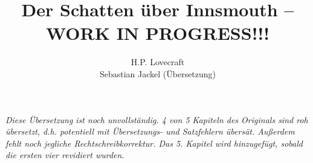 \documentclass[a4paper]{memoir}
\begin{document}
\title{Der Schatten über Innsmouth -- WORK IN PROGRESS!!!}
\author{H.P. Lovecraft\\
		Sebastian Jackel (Übersetzung)}
\date{}
\maketitle

\textit{Diese Übersetzung ist noch unvollständig. 4 von 5 Kapiteln des Originals sind roh übersetzt, d.h. potentiell mit Übersetzungs- und Satzfehlern übersät. Außerdem fehlt noch jegliche Rechtschreibkorrektur. Das 5. Kapitel wird hinzugefügt, sobald die ersten vier revidiert wurden.}





\end{document}
